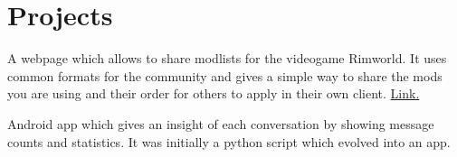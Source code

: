 \documentclass[]{plushcv}
\begin{document}
\begin{minipage}[t]{0.25\textwidth}
    \section{Projects}

    A webpage which allows to share modlists for the videogame Rimworld. It uses common formats for the community and gives a simple way to share the mods you are using and their order for others to apply in their own client. \href{https://sharemods.jacobrr.me/}{Link.}
    \sectionsep

    Android app which gives an insight of each conversation by showing message counts and statistics. It was initially a python script which evolved into an app.
    \sectionsep

\end{minipage}
\end{document}
